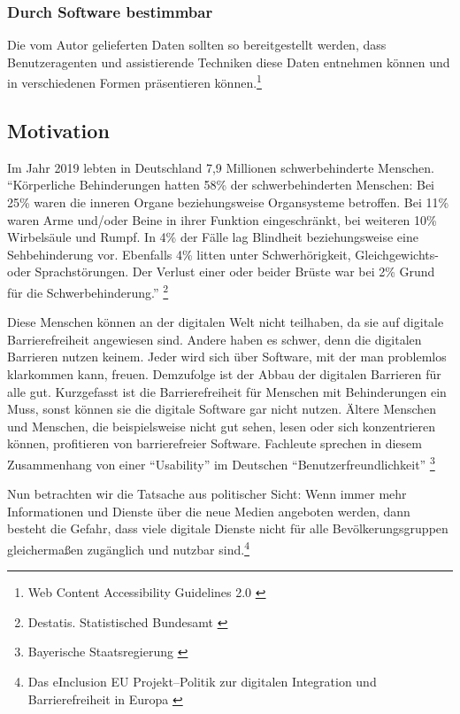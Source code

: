 \subsubsection{Durch Software bestimmbar}
Die vom Autor gelieferten Daten sollten so bereitgestellt werden, dass Benutzeragenten und assistierende Techniken diese Daten entnehmen können und in verschiedenen
Formen präsentieren können.\footnote{Web Content Accessibility Guidelines 2.0 \cite{WCAG2.0}}

\subsection{Motivation}
\label{subsec: Motivation}

Im Jahr 2019 lebten in Deutschland 7,9 Millionen schwerbehinderte Menschen. "`Körperliche Behinderungen hatten 58\% der schwerbehinderten Menschen: Bei 25\% waren die inneren Organe beziehungsweise Organsysteme betroffen. Bei 11\% waren Arme und/oder Beine in ihrer Funktion eingeschränkt, bei weiteren 10\% Wirbelsäule und Rumpf. In 4\% der Fälle lag Blindheit beziehungsweise eine Sehbehinderung vor. Ebenfalls 4\% litten unter Schwerhörigkeit, Gleichgewichts- oder Sprachstörungen. Der Verlust einer oder beider Brüste war bei 2\% Grund für die Schwerbehinderung."' \footnote{Destatis. Statistisched Bundesamt \cite{DESTATIS}}

Diese Menschen können an der digitalen Welt nicht teilhaben, da sie auf digitale Barrierefreiheit angewiesen sind. Andere haben es schwer, denn die digitalen Barrieren nutzen keinem. Jeder wird sich über Software, mit der man problemlos klarkommen kann, freuen. Demzufolge ist der Abbau der digitalen Barrieren für alle gut. Kurzgefasst ist die Barrierefreiheit für Menschen mit Behinderungen ein Muss, sonst können sie die digitale Software gar nicht nutzen. Ältere Menschen und Menschen, die beispielsweise nicht gut sehen, lesen oder sich konzentrieren können, profitieren von barrierefreier Software. Fachleute sprechen in diesem Zusammenhang von einer "`Usability"' im Deutschen "`Benutzerfreundlichkeit"' \footnote{Bayerische Staatsregierung \cite{BS}}

Nun betrachten wir die Tatsache aus politischer Sicht: Wenn immer mehr Informationen und Dienste über die neue Medien angeboten werden, dann besteht die Gefahr, dass viele digitale Dienste nicht für alle Bevölkerungsgruppen gleichermaßen zugänglich und nutzbar sind.\footnote{Das eInclusion EU Projekt--Politik zur digitalen Integration und Barrierefreiheit in Europa \cite{redingeinclusion}}